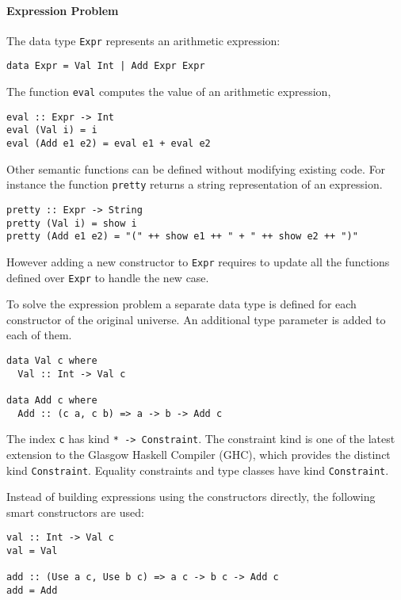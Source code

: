 \documentclass[../Thesis.tex]{subfiles}
\begin{document}
\paragraph{Expression Problem}
The data type \texttt{Expr} represents an arithmetic expression:
\begin{verbatim}
data Expr = Val Int | Add Expr Expr
\end{verbatim}

The function \texttt{eval} computes the value of an arithmetic expression,
\begin{verbatim}
eval :: Expr -> Int
eval (Val i) = i
eval (Add e1 e2) = eval e1 + eval e2
\end{verbatim}

Other semantic functions can be defined without modifying existing code.
For instance the function \texttt{pretty} returns a string representation of an expression.

\begin{verbatim}
pretty :: Expr -> String
pretty (Val i) = show i
pretty (Add e1 e2) = "(" ++ show e1 ++ " + " ++ show e2 ++ ")"
\end{verbatim}

However adding a new constructor to \texttt{Expr} requires to update
all the functions defined over \texttt{Expr} to handle the new case.

To solve the expression problem a separate data type is defined for 
each constructor of the original universe.
An additional type parameter is added to each of them.

\begin{verbatim}
data Val c where
  Val :: Int -> Val c
  
data Add c where
  Add :: (c a, c b) => a -> b -> Add c
\end{verbatim}

The index \texttt{c} has kind \texttt{* -> Constraint}.
The constraint kind is one of the latest extension to the Glasgow Haskell Compiler (GHC), which provides the distinct kind \texttt{Constraint}.
Equality constraints and type classes have kind \texttt{Constraint}.

Instead of building expressions using the constructors directly, the following smart constructors are used:

\begin{verbatim}
val :: Int -> Val c
val = Val

add :: (Use a c, Use b c) => a c -> b c -> Add c
add = Add 
\end{verbatim}
\end{document}

